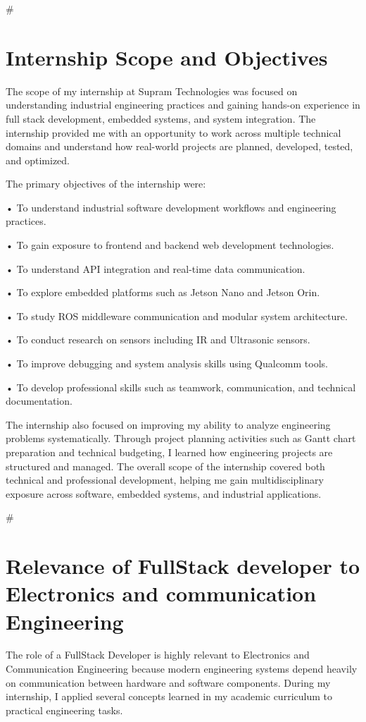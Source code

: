 \documentclass[12pt,a4paper]{report}
\begin{document}
\#


\section{Internship Scope and Objectives}

The scope of my internship at Supram Technologies was focused on understanding industrial engineering practices and gaining hands-on experience in full stack development, embedded systems, and system integration. The internship provided me with an opportunity to work across multiple technical domains and understand how real-world projects are planned, developed, tested, and optimized.


The primary objectives of the internship were:


• To understand industrial software development workflows and engineering practices.


• To gain exposure to frontend and backend web development technologies.


• To understand API integration and real-time data communication.


• To explore embedded platforms such as Jetson Nano and Jetson Orin.


• To study ROS middleware communication and modular system architecture.


• To conduct research on sensors including IR and Ultrasonic sensors.


• To improve debugging and system analysis skills using Qualcomm tools.


• To develop professional skills such as teamwork, communication, and technical documentation.


The internship also focused on improving my ability to analyze engineering problems systematically. Through project planning activities such as Gantt chart preparation and technical budgeting, I learned how engineering projects are structured and managed. The overall scope of the internship covered both technical and professional development, helping me gain multidisciplinary exposure across software, embedded systems, and industrial applications.


\#


\section{Relevance of FullStack developer to Electronics and communication Engineering}

The role of a FullStack Developer is highly relevant to Electronics and Communication Engineering because modern engineering systems depend heavily on communication between hardware and software components. During my internship, I applied several concepts learned in my academic curriculum to practical engineering tasks.
\end{document}
